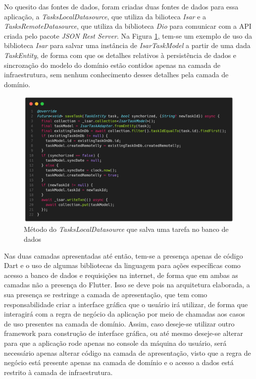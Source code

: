 \documentclass[12pt, %
openright, 
oneside, %
a4paper,    %
brazil]{facom-ufu-abntex2}
\begin{document}
No quesito das fontes de dados, foram criadas duas fontes de dados para essa aplicação, a \textit{TasksLocalDatasource}, que utiliza da bilioteca \textit{Isar} e a \textit{TasksRemoteDatasource}, que utiliza da biblioteca \textit{Dio} para comunicar com a API criada pelo pacote \textit{JSON Rest Server}. Na Figura \ref{fig:save_local_task}, tem-se um exemplo de uso da biblioteca \textit{Isar} para salvar uma instância de \textit{IsarTaskModel} a partir de uma dada \textit{TaskEntity}, de forma com que os detalhes relativos à persistência de dados e sincrozação do modelo do domínio estão contidos apenas na camada de infraestrutura, sem nenhum conhecimento desses detalhes pela camada de domínio.

\begin{figure}[ht]
    \centering
    \includegraphics[width=.7\textwidth, trim={0 30 0 100}, clip]{figures/arch/save_local_task.png}
    \caption{Método do \textit{TasksLocalDatasource} que salva uma tarefa no banco de dados}
    \label{fig:save_local_task}
\end{figure}

Nas duas camadas apresentadas até então, tem-se a presença apenas de código Dart e o uso de algumas bibliotecas da linguagem para ações específicas como acesso a banco de dados e requisições na internet, de forma que em ambas as camadas não a presença do Flutter. Isso se deve pois na arquitetura elaborada, a sua presença se restringe a camada de apresentação, que tem como responsabilidade criar a interface gráfica que o usuário irá utilizar, de forma que interagirá com a regra de negócio da aplicação por meio de chamadas aos casos de uso presentes na camada de domínio. Assim, caso deseje-se utilizar outro framework para construção de interface gráfica, ou até mesmo deseje-se alterar para que a aplicação rode apenas no console da máquina do usuário, será necessário apenas alterar código na camada de apresentação, visto que a regra de negócio está presente apenas na camada de domínio e o acesso a dados está restrito à camada de infraestrutura.
\end{document}
